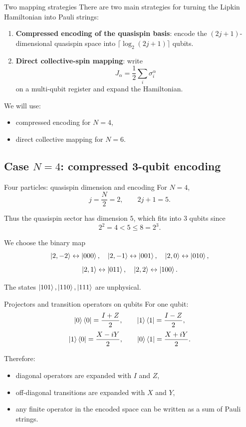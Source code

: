 \documentclass[aspectratio=169]{beamer}
\begin{document}
\begin{frame}{Two mapping strategies}
There are two main strategies for turning the Lipkin Hamiltonian into Pauli strings:
\begin{enumerate}
\item \textbf{Compressed encoding of the quasispin basis}: encode the \((2j+1)\)-dimensional quasispin space into \(\lceil \log_2(2j+1)\rceil\) qubits.
\item \textbf{Direct collective-spin mapping}: write
\[
J_\alpha = \frac12\sum_i \sigma_i^\alpha
\]
on a multi-qubit register and expand the Hamiltonian.
\end{enumerate}

We will use:
\begin{itemize}
\item compressed encoding for \(N=4\),
\item direct collective mapping for \(N=6\).
\end{itemize}
\end{frame}

\subsection{Case \(N=4\): compressed 3-qubit encoding}

\begin{frame}{Four particles: quasispin dimension and encoding}
For \(N=4\),
\[
j=\frac{N}{2}=2,
\qquad
2j+1 = 5.
\]

Thus the quasispin sector has dimension \(5\), which fits into \(3\) qubits since
\[
2^2=4<5\le 8=2^3.
\]

We choose the binary map
\[
\ket{2,-2}\leftrightarrow \ket{000},\quad
\ket{2,-1}\leftrightarrow \ket{001},\quad
\ket{2,0}\leftrightarrow \ket{010},
\]
\[
\ket{2,1}\leftrightarrow \ket{011},\quad
\ket{2,2}\leftrightarrow \ket{100}.
\]

The states \(\ket{101},\ket{110},\ket{111}\) are unphysical.
\end{frame}

\begin{frame}{Projectors and transition operators on qubits}
For one qubit:
\[
\ket{0}\bra{0}=\frac{I+Z}{2},
\qquad
\ket{1}\bra{1}=\frac{I-Z}{2},
\]
\[
\ket{1}\bra{0}=\frac{X-iY}{2},
\qquad
\ket{0}\bra{1}=\frac{X+iY}{2}.
\]

Therefore:
\begin{itemize}
\item diagonal operators are expanded with \(I\) and \(Z\),
\item off-diagonal transitions are expanded with \(X\) and \(Y\),
\item any finite operator in the encoded space can be written as a sum of Pauli strings.
\end{itemize}
\end{frame}
\end{document}
